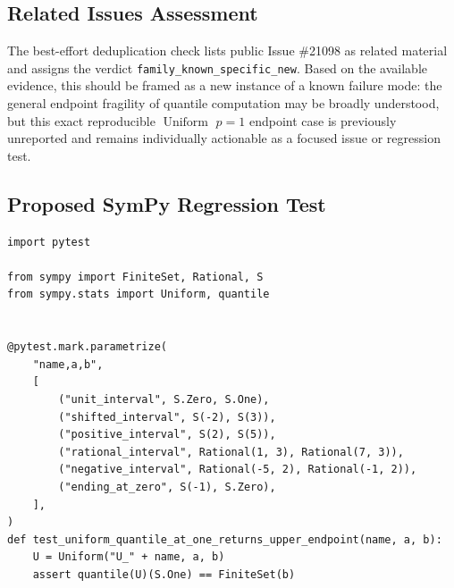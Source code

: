 \documentclass[11pt]{article}
\begin{document}
\subsection{Related Issues Assessment}

The best-effort deduplication check lists public Issue \#21098 as related material and assigns the verdict \texttt{family\_known\_specific\_new}.  Based on the available evidence, this should be framed as a new instance of a known failure mode: the general endpoint fragility of quantile computation may be broadly understood, but this exact reproducible \(\operatorname{Uniform}\) \(p=1\) endpoint case is previously unreported and remains individually actionable as a focused issue or regression test.

\subsection{Proposed SymPy Regression Test}

\medskip

\begin{lstlisting}[style=bugpython]
import pytest

from sympy import FiniteSet, Rational, S
from sympy.stats import Uniform, quantile


@pytest.mark.parametrize(
    "name,a,b",
    [
        ("unit_interval", S.Zero, S.One),
        ("shifted_interval", S(-2), S(3)),
        ("positive_interval", S(2), S(5)),
        ("rational_interval", Rational(1, 3), Rational(7, 3)),
        ("negative_interval", Rational(-5, 2), Rational(-1, 2)),
        ("ending_at_zero", S(-1), S.Zero),
    ],
)
def test_uniform_quantile_at_one_returns_upper_endpoint(name, a, b):
    U = Uniform("U_" + name, a, b)
    assert quantile(U)(S.One) == FiniteSet(b)
\end{lstlisting}
\end{document}
